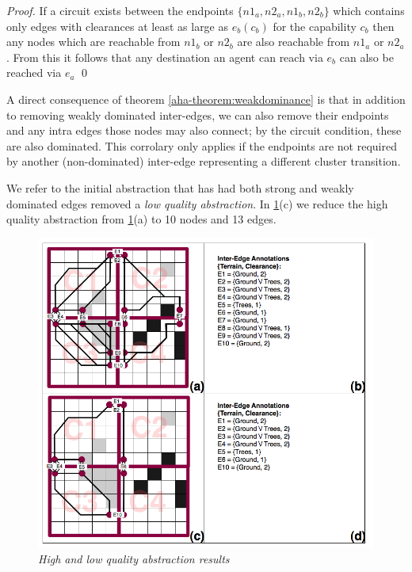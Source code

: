 \begin{proof}
If a circuit exists between the endpoints $\lbrace n1_{a}, n2_{a}, n1_{b}, n2_{b} \rbrace$ which contains only edges with clearances at least as large as $e_{b}(c_{b})$ for the capability $c_{b}$ then any nodes which are reachable from $n1_{b}$ or $n2_{b}$ are also reachable from $n1_{a}$ or $n2_{a}$.
From this it follows that any destination an agent can reach via $e_{b}$ can also be reached via $e_{a}$ \qed
\end{proof}
A direct consequence of theorem \ref{aha-theorem:weakdominance} is that in addition to removing weakly dominated inter-edges, we can also remove their endpoints and any intra edges those nodes may also connect; by the circuit condition, these are also dominated. 
This corrolary only applies if the endpoints are not required by another (non-dominated) inter-edge representing a different cluster transition. 
\par \indent
We refer to the initial abstraction that has had both strong and weakly dominated edges removed a \emph{low quality abstraction}.
In \ref{aha-fig:abstractgraph}(c) we reduce the high quality abstraction from \ref{aha-fig:abstractgraph}(a) to 10 nodes and 13 edges.
\begin{figure}[htbp]
        \caption{\emph{High and low quality abstraction results} }
        \begin{center}
                        \includegraphics[scale=0.25]{diagrams/abstraction_result.png}
        \end{center}
        \label{aha-fig:abstractgraph}
\end{figure}
